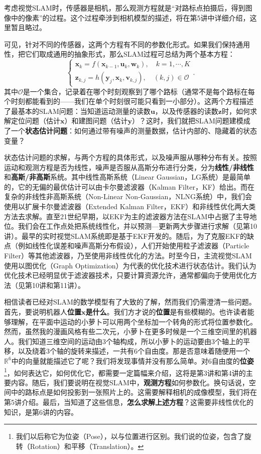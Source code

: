 考虑视觉SLAM时，传感器是相机，那么观测方程就是“对路标点拍摄后，得到图像中的像素”的过程。这个过程牵涉到相机模型的描述，将在第5讲中详细介绍，这里暂且略过。

可见，针对不同的传感器，这两个方程有不同的参数化形式。如果我们保持通用性，把它们取成通用的抽象形式，那么SLAM过程可总结为两个基本方程：
\begin{equation}
\label{eq:slamproblem}
\left\{ \begin{array}{l}
{\bm{x}_k} = f\left( {{\bm{x}_{k - 1}},{\bm{u}_k}}, \bm{w}_k \right),\quad k=1,\cdots, K\\
{\bm{z}_{k,j}} = h\left( {{ \bm{y}_j},{ \bm{x}_k}}, \bm{v}_{k,j} \right), \quad (k,j) \in \mathcal{O}
\end{array} \right. .
\end{equation}
其中$\mathcal{O}$是一个集合，记录着在哪个时刻观察到了哪个路标（通常不是每个路标在每个时刻都能看到的——我们在单个时刻很可能只看到一小部分）。这两个方程描述了最基本的SLAM问题：当知道运动测量的读数$\bm{u}$，以及传感器的读数$\bm{z}$时，如何求解定位问题（估计$\bm{x}$）和建图问题（估计$\bm{y}$）？这时，我们就把SLAM问题建模成了一个\textbf{状态估计问题}：如何通过带有噪声的测量数据，估计内部的、隐藏着的状态变量？

状态估计问题的求解，与两个方程的具体形式，以及噪声服从哪种分布有关。按照运动和观测方程是否为线性，噪声是否服从高斯分布进行分类，分为\textbf{线性/非线性}和\textbf{高斯/非高斯}系统。其中线性高斯系统（Linear Gaussian，LG系统）是最简单的，它的无偏的最优估计可以由卡尔曼滤波器（Kalman Filter，KF）给出。而在复杂的非线性非高斯系统（Non-Linear Non-Gaussian，NLNG系统）中，我们会使用以扩展卡尔曼滤波器（Extended Kalman Filter，EKF）和非线性优化两大类方法去求解。直至21世纪早期，以EKF为主的滤波器方法在SLAM中占据了主导地位。我们会在工作点处把系统线性化，并以预测—更新两大步骤进行求解（见第10讲）。最早的实时视觉SLAM系统即是基于EKF\textsuperscript{\cite{Davison2007}}开发的。随后，为了克服EKF的缺点（例如线性化误差和噪声高斯分布假设），人们开始使用粒子滤波器（Particle Filter）等其他滤波器，乃至使用非线性优化的方法。时至今日，主流视觉SLAM使用以图优化（Graph Optimization）为代表的优化技术进行状态估计\textsuperscript{\cite{Strasdat2012}}。我们认为优化技术已经明显优于滤波器技术，只要计算资源允许，通常都偏向于使用优化方法（见第10讲和第11讲）。

\clearpage
相信读者已经对SLAM的数学模型有了大致的了解，然而我们仍需澄清一些问题。首先，要说明机器人\textbf{位置$\bm{x}$是什么}。我们方才说的\textbf{位置}是有些模糊的。也许读者能够理解，在平面中运动的小萝卜可以用两个坐标加一个转角的形式将位置参数化。然而，虽然我的漫画风格有些二次元，小萝卜在更多时候是一个三维空间里的机器人。我们知道三维空间的运动由3个轴构成，所以小萝卜的运动要由3个轴上的平移，以及绕着3个轴的旋转来描述，一共有6个自由度。那是否意味着随便用一个$\mathbb{R}^6$中的向量就能描述它了呢？我们将发现事情并没有那么简单。对6自由度的\textbf{位姿}\footnote{我们以后称它为位姿（Pose），以与位置进行区别。我们说的位姿，包含了旋转（Rotation）和平移（Translation）。}，如何表达它，如何优化它，都需要一定篇幅来介绍，这将是第3讲和第4讲的主要内容。随后，我们要说明在视觉SLAM中，\textbf{观测方程}如何参数化。换句话说，空间中的路标点是如何投影到一张照片上的。这需要解释相机的成像模型，我们将在第5讲介绍。最后，当知道了这些信息，\textbf{怎么求解上述方程}？这需要非线性优化的知识，是第6讲的内容。

